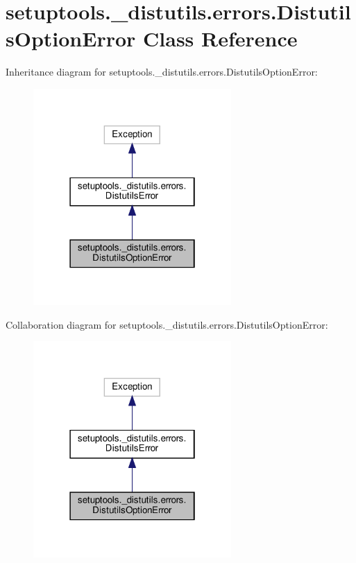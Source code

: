 \hypertarget{classsetuptools_1_1__distutils_1_1errors_1_1DistutilsOptionError}{}\section{setuptools.\+\_\+distutils.\+errors.\+Distutils\+Option\+Error Class Reference}
\label{classsetuptools_1_1__distutils_1_1errors_1_1DistutilsOptionError}


Inheritance diagram for setuptools.\+\_\+distutils.\+errors.\+Distutils\+Option\+Error\+:
\nopagebreak
\begin{figure}[H]
\begin{center}
\leavevmode
\includegraphics[width=214pt]{classsetuptools_1_1__distutils_1_1errors_1_1DistutilsOptionError__inherit__graph}
\end{center}
\end{figure}


Collaboration diagram for setuptools.\+\_\+distutils.\+errors.\+Distutils\+Option\+Error\+:
\nopagebreak
\begin{figure}[H]
\begin{center}
\leavevmode
\includegraphics[width=214pt]{classsetuptools_1_1__distutils_1_1errors_1_1DistutilsOptionError__coll__graph}
\end{center}
\end{figure}


